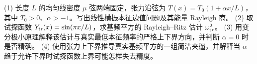 (1) 长度 \(L\) 的均匀线密度 \(\mu\) 弦两端固定，张力沿弦为 \(T(x)=T_0(1+\alpha x/L)\)，其中 \(T_0>0\)、\(\alpha>-1\)。写出线性横振本征边值问题及其能量 Rayleigh 商。
(2) 取试探函数 \(Y_{\rm tr}(x)=\sin(\pi x/L)\)，求基频平方的 Rayleigh–Ritz 估计 \(\omega_{\rm tr}^2\)。
(3) 用变分极小原理解释该估计与真实最低本征频率的严格上下界方向，并判断 \(\alpha=0\) 时是否精确。
(4) 使用张力上下界推导真实基频平方的一组简洁夹逼，并解释当 \(\alpha\) 趋于允许下界时试探函数上界可能怎样失去精度。
